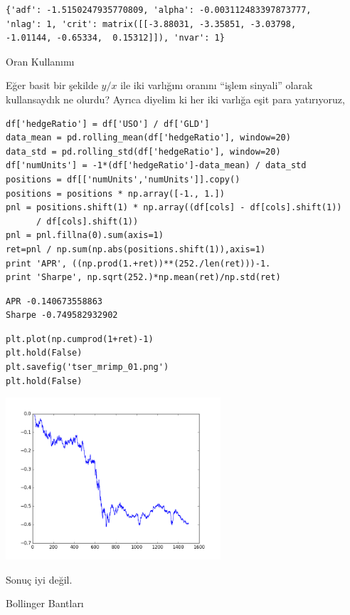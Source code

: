 \documentclass[12pt,fleqn]{article}\usepackage{../../common}
\begin{document}
\begin{verbatim}
{'adf': -1.5150247935770809, 'alpha': -0.003112483397873777,
'nlag': 1, 'crit': matrix([[-3.88031, -3.35851, -3.03798,
-1.01144, -0.65334,  0.15312]]), 'nvar': 1}
\end{verbatim}

Oran Kullanımı

Eğer basit bir şekilde $y/x$ ile iki varlığını oranını ``işlem sinyali''
olarak kullansaydık ne olurdu? Ayrıca diyelim ki her iki varlığa eşit para
yatırıyoruz,

\begin{verbatim}
df['hedgeRatio'] = df['USO'] / df['GLD']
data_mean = pd.rolling_mean(df['hedgeRatio'], window=20)
data_std = pd.rolling_std(df['hedgeRatio'], window=20)
df['numUnits'] = -1*(df['hedgeRatio']-data_mean) / data_std
positions = df[['numUnits','numUnits']].copy()
positions = positions * np.array([-1., 1.])
pnl = positions.shift(1) * np.array((df[cols] - df[cols].shift(1))  
      / df[cols].shift(1))
pnl = pnl.fillna(0).sum(axis=1)
ret=pnl / np.sum(np.abs(positions.shift(1)),axis=1)
print 'APR', ((np.prod(1.+ret))**(252./len(ret)))-1.
print 'Sharpe', np.sqrt(252.)*np.mean(ret)/np.std(ret)
\end{verbatim}

\begin{verbatim}
APR -0.140673558863
Sharpe -0.749582932902
\end{verbatim}

\begin{verbatim}
plt.plot(np.cumprod(1+ret)-1)
plt.hold(False)
plt.savefig('tser_mrimp_01.png')
plt.hold(False)
\end{verbatim}

\includegraphics[height=6cm]{tser_mrimp_01.png}

Sonuç iyi değil. 

Bollinger Bantları
\end{document}
